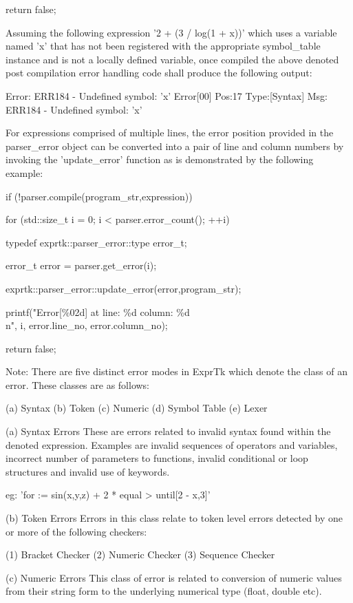 {{	return false;
}


Assuming the  following expression '2 + (3 / log(1 + x))' which uses a
variable named 'x'  that has not been registered  with the appropriate
symbol\_table  instance and  is not  a locally  defined variable,  once
compiled the  above denoted post compilation error handling code shall
produce the following output:

Error: ERR184 - Undefined symbol: 'x'
Error[00] Pos:17 Type:[Syntax] Msg: ERR184 - Undefined symbol: 'x'


For  expressions  comprised  of  multiple  lines,  the  error position
provided in the  parser\_error object can  be converted into  a pair of
line and column numbers by invoking the 'update\_error' function as  is
demonstrated by the following example:

if (!parser.compile(program\_str,expression))
{
	for (std::size\_t i = 0; i < parser.error\_count(); ++i)
	{
		typedef exprtk::parser\_error::type error\_t;
		
		error\_t error = parser.get\_error(i);
		
		exprtk::parser\_error::update\_error(error,program\_str);
		
		printf("Error[\%02d] at line: \%d column: \%d\\n",
		i,
		error.line\_no,
		error.column\_no);
	}
	
	return false;
}


Note: There are five  distinct error modes in  ExprTk which denote the
class of an error. These classes are as follows:

(a) Syntax
(b) Token
(c) Numeric
(d) Symbol Table
(e) Lexer


(a) Syntax Errors
These are errors  related to invalid  syntax found within  the denoted
expression. Examples are invalid sequences of operators and variables,
incorrect number  of parameters  to functions,  invalid conditional or
loop structures and invalid use of keywords.

eg:  'for := sin(x,y,z) + 2 * equal > until[2 - x,3]'


(b) Token Errors
Errors in this class relate to  token level errors detected by one  or
more of the following checkers:

(1) Bracket Checker
(2) Numeric Checker
(3) Sequence Checker


(c) Numeric Errors
This class of  error is related  to conversion of  numeric values from
their  string form  to the  underlying numerical  type (float,  double
etc).

}
